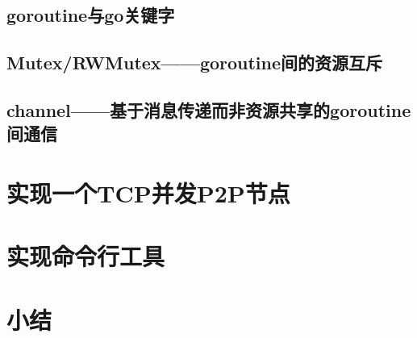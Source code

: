 \subsection{goroutine与go关键字}

\subsection{Mutex/RWMutex——goroutine间的资源互斥}

\subsection{channel——基于消息传递而非资源共享的goroutine间通信}

\section{实现一个TCP并发P2P节点}

\section{实现命令行工具}

\section{小结}